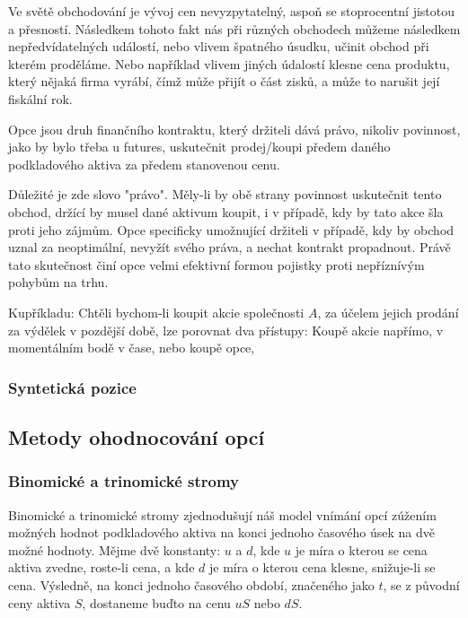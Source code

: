 \documentclass{article}
\begin{document}
  Ve světě obchodování je vývoj cen nevyzpytatelný, aspoň se stoprocentní jistotou a přesností. Následkem tohoto fakt nás při různých obchodech můžeme následkem nepředvídatelných událostí, nebo vlivem špatného úsudku, učinit obchod při kterém proděláme. Nebo například vlivem jiných údalostí klesne cena produktu, který nějaká firma vyrábí, čímž může přijít o část zisků, a může to narušit její fiskální rok.

  Opce jsou druh finančního kontraktu, který držiteli dává právo, nikoliv povinnost, jako by bylo třeba u futures, uskutečnit prodej/koupi předem daného podkladového aktiva za předem stanovenou cenu.

  Důležité je zde slovo "právo". Měly-li by obě strany povinnost uskutečnit tento obchod, držící by musel dané aktivum koupit, i v případě, kdy by tato akce šla proti jeho zájmům. Opce specificky umožnující držiteli v případě, kdy by obchod uznal za neoptimální, nevyžít svého práva, a nechat kontrakt propadnout. Právě tato skutečnost činí opce velmi efektivní formou pojistky proti nepříznívým pohybům na trhu.

  Kupříkladu: Chtěli bychom-li koupit akcie společnosti $A$, za účelem jejich prodání za výdělek v pozdější době, lze porovnat dva přístupy: Koupě akcie napřímo, v momentálním bodě v čase, nebo koupě opce, 

  \subsubsection{Syntetická pozice}

  \subsection{Metody ohodnocování opcí}

  \subsubsection{Binomické a trinomické stromy}

  Binomické a trinomické stromy zjednodušují náš model vnímání opcí zúžením možných hodnot podkladového aktiva na konci jednoho časového úsek na dvě možné hodnoty. Mějme dvě konstanty: $u$ a $d$, kde $u$ je míra o kterou se cena aktiva zvedne, roste-li cena, a kde $d$ je míra o kterou cena klesne, snižuje-li se cena. Výsledně, na konci jednoho časového období, značeného jako $t$, se z původní ceny aktiva $S$, dostaneme buďto na cenu $uS$ nebo $dS$.
\end{document}
